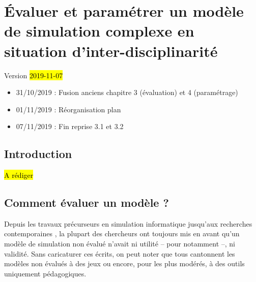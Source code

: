 \chapter{Évaluer et paramétrer un modèle de simulation complexe en situation d'inter-disciplinarité}
\label{chap:chap3}
\begin{center}
{\large Version \hl{2019-11-07}}
\end{center}
\begin{itemize}
	\item 31/10/2019 : Fusion anciens chapitre 3 (évaluation) et 4 (paramétrage)
	\item 01/11/2019 : Réorganisation plan
	\item 07/11/2019 : Fin reprise 3.1 et 3.2
\end{itemize}


\minitoc
\clearpage

\section*{Introduction}
\label{sec:chap3-4-intro}

\begin{center}
	\hl{A rédiger}
\end{center}


\section{Comment évaluer un modèle ?}\label{sec:evaluer-modele}

Depuis les travaux précurseurs en simulation informatique \autocite{naylor_verification_1967,hermann_validation_1967,sargent_validation_1979} jusqu'aux recherches contemporaines \autocite{amblard_evaluation_2006,banos_pour_2013,augusiak_merging_2014, rey-coyrehourcq_plateforme_2015}, la plupart des chercheurs ont toujours mis en avant qu'un modèle de simulation non évalué n'avait ni utilité -- pour \cite{naylor_verification_1967} notamment --, ni validité.
Sans caricaturer ces écrits, on peut noter que tous cantonnent les modèles non évalués à des \og jeux\fg{} ou encore, pour les plus modérés, à des outils uniquement pédagogiques.

